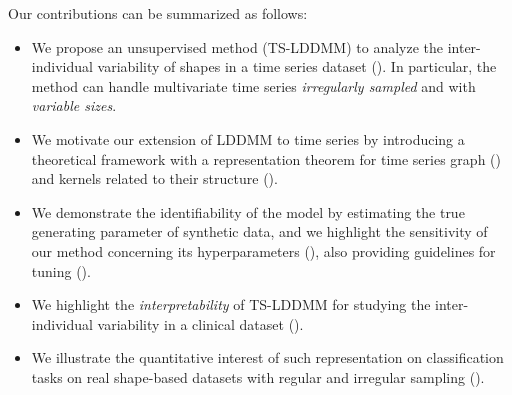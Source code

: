    Our contributions can be summarized as follows:
    \begin{itemize}
       \item We propose an unsupervised method (TS-LDDMM) to analyze the inter-individual variability of shapes in a time series dataset (). In particular, the method can handle multivariate time series \textit{irregularly sampled} and with \textit{variable sizes}.
       \item We motivate our extension of LDDMM to time series by introducing a theoretical framework with a representation theorem for time series graph () and kernels related to their structure ().
       \item We demonstrate the identifiability of the model by estimating the true generating parameter of synthetic data, and we highlight the sensitivity of our method concerning its hyperparameters (), also providing guidelines for tuning ().
       \item We highlight the \textit{interpretability} of TS-LDDMM for studying the inter-individual variability in a clinical dataset ().
        \item We illustrate the quantitative interest of such representation on classification tasks on real shape-based datasets with regular and irregular sampling ().
 \end{itemize}

      
